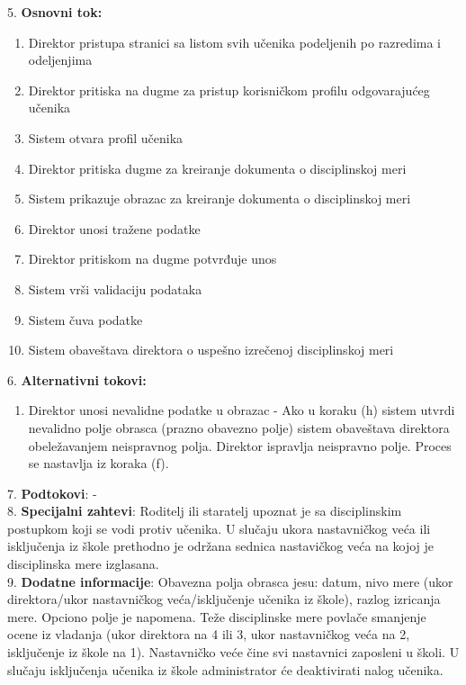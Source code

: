 \documentclass{article}
\begin{document}
5. \textbf{Osnovni tok:} 
\begin{enumerate} [label=(\alph*)]
\item Direktor pristupa stranici sa listom svih učenika podeljenih po razredima i odeljenjima 
\item Direktor pritiska na dugme za pristup korisničkom profilu odgovarajućeg učenika
\item Sistem otvara profil učenika
\item Direktor pritiska dugme za kreiranje dokumenta o disciplinskoj meri
\item Sistem prikazuje obrazac za kreiranje dokumenta o disciplinskoj meri 
\item Direktor unosi tražene podatke
\item Direktor pritiskom na dugme potvrđuje unos
\item Sistem vrši validaciju podataka
\item Sistem čuva podatke
\item Sistem obaveštava direktora o uspešno izrečenoj disciplinskoj meri
\end{enumerate}

6. \textbf{Alternativni tokovi:}
\begin{enumerate} [label=(\roman*)]
\item Direktor unosi nevalidne podatke u obrazac - Ako u koraku (h) sistem utvrdi nevalidno polje obrasca (prazno obavezno polje) sistem obaveštava direktora obeležavanjem neispravnog polja. Direktor ispravlja neispravno polje. Proces se nastavlja iz koraka (f).
\end{enumerate}

7. \textbf{Podtokovi}: - \\

8. \textbf{Specijalni zahtevi}: Roditelj ili staratelj upoznat je sa disciplinskim postupkom koji se vodi protiv učenika. U slučaju ukora nastavničkog veća ili isključenja iz škole prethodno je održana sednica nastavičkog veća na kojoj je disciplinska mere izglasana. \\

9. \textbf{Dodatne informacije}: Obavezna polja obrasca jesu: datum, nivo mere (ukor direktora/ukor nastavničkog veća/isključenje učenika iz škole), razlog izricanja mere. Opciono polje je napomena. Teže disciplinske mere povlače smanjenje ocene iz vladanja (ukor direktora na 4 ili 3, ukor nastavničkog veća na 2, isključenje iz škole na 1). Nastavničko veće čine svi nastavnici zaposleni u školi. U slučaju isključenja učenika iz škole administrator će deaktivirati nalog učenika. \\
\end{document}
